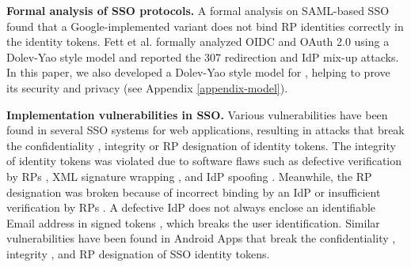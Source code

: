  \oldc\noindent\textbf{Formal analysis of SSO protocols.}
A formal analysis on SAML-based SSO \cite{ArmandoCCCT08} found that a Google-implemented variant does not bind RP identities correctly in the identity tokens.
Fett et al. \cite{FettKS16, FettKS17} formally analyzed OIDC and OAuth 2.0 using a Dolev-Yao style model \cite{FettKS14} and reported the 307 redirection and IdP mix-up attacks.
\newc In this paper, we also developed a Dolev-Yao style model for \usso, helping to prove its security and privacy (see Appendix \ref{appendix-model}).

\oldc


\noindent\textbf{Implementation vulnerabilities in SSO.}
Various vulnerabilities have been found in several SSO systems for web applications, resulting in attacks %
that break the confidentiality \cite{WangCW12,ccsSunB12, ArmandoCCCPS13, DiscoveringJCS,dimvaLiM16}, integrity \cite{WangCW12, SomorovskyMSKJ12, WangZLG16, MainkaMS16, MainkaMSW17,dimvaLiM16} or RP designation \cite{WangZLG16, MainkaMS16, MainkaMSW17, YangLCZ18,dimvaLiM16} of identity tokens.
The integrity of identity tokens was violated %
due to software flaws such as defective verification by RPs \cite{WangCW12,WangZLG16,MainkaMSW17}, XML signature wrapping \cite{SomorovskyMSKJ12}, and IdP spoofing \cite{MainkaMS16,MainkaMSW17}.
Meanwhile, the RP designation was broken because of incorrect binding by an IdP \cite{YangLCZ18, WangZLG16} or insufficient verification by RPs \cite{MainkaMS16, MainkaMSW17, YangLCZ18}.
A defective IdP does not always enclose an identifiable Email address in signed tokens \cite{WangCW12},
 which breaks the user identification.
Similar vulnerabilities have been found in Android Apps that break the confidentiality \cite{ChenPCTKT14, WangZLLYLG15, YangLS17, ShiWL19}, integrity \cite{ChenPCTKT14, YangLS17}, and RP designation \cite{ChenPCTKT14, ShiWL19, WangZLLYLG15} of SSO identity tokens.



